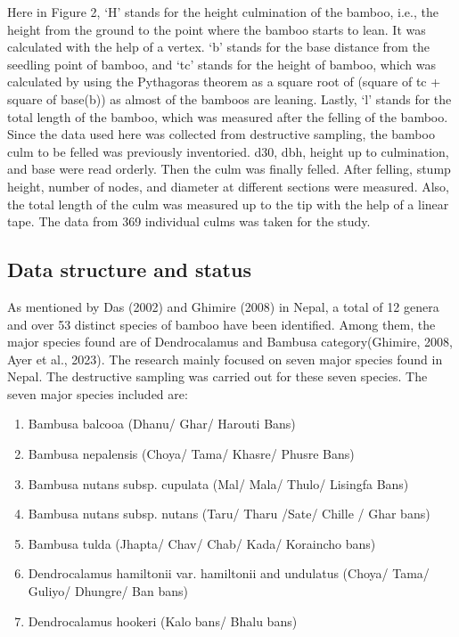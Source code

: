 \documentclass[preprint, 3p,
authoryear]{elsarticle} %
\begin{document}
Here in Figure 2, `H' stands for the height culmination of the bamboo,
i.e., the height from the ground to the point where the bamboo starts to
lean. It was calculated with the help of a vertex. `b' stands for the
base distance from the seedling point of bamboo, and `tc' stands for the
height of bamboo, which was calculated by using the Pythagoras theorem
as a square root of (square of tc + square of base(b)) as almost of the
bamboos are leaning. Lastly, `l' stands for the total length of the
bamboo, which was measured after the felling of the bamboo. Since the
data used here was collected from destructive sampling, the bamboo culm
to be felled was previously inventoried. d30, dbh, height up to
culmination, and base were read orderly. Then the culm was finally
felled. After felling, stump height, number of nodes, and diameter at
different sections were measured. Also, the total length of the culm was
measured up to the tip with the help of a linear tape. The data from 369
individual culms was taken for the study.

\hypertarget{data-structure-and-status}{%
\subsection{Data structure and status}\label{data-structure-and-status}}

As mentioned by Das (2002) and Ghimire (2008) in Nepal, a total of 12
genera and over 53 distinct species of bamboo have been identified.
Among them, the major species found are of Dendrocalamus and Bambusa
category(Ghimire, 2008, Ayer et al., 2023). The research mainly focused
on seven major species found in Nepal. The destructive sampling was
carried out for these seven species. The seven major species included
are:

\begin{enumerate}
\def\labelenumi{\alph{enumi})}
\item
  Bambusa balcooa (Dhanu/ Ghar/ Harouti Bans)
\item
  Bambusa nepalensis (Choya/ Tama/ Khasre/ Phusre Bans)
\item
  Bambusa nutans subsp. cupulata (Mal/ Mala/ Thulo/ Lisingfa Bans)
\item
  Bambusa nutans subsp. nutans (Taru/ Tharu /Sate/ Chille / Ghar bans)
\item
  Bambusa tulda (Jhapta/ Chav/ Chab/ Kada/ Koraincho bans)
\item
  Dendrocalamus hamiltonii var. hamiltonii and undulatus (Choya/ Tama/
  Guliyo/ Dhungre/ Ban bans)
\item
  Dendrocalamus hookeri (Kalo bans/ Bhalu bans)
\end{enumerate}
\end{document}
